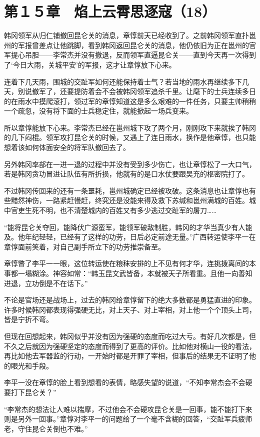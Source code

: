 \section{第１５章　焰上云霄思逐寇（18）}

韩冈领军从归仁铺撤回昆仑关的消息，章惇前天已经收到了。之前韩冈领军直扑邕州的军报曾差点让他跳脚，看到韩冈返回昆仑关的消息，他仍依旧为正在邕州的官军提心吊胆——李常杰并没有撤退，反而领军直逼昆仑关——直到今天再一次得到了‘今日大雨，关城平安’的军报，这才让章惇放下心来。

连着下几天雨，围城的交趾军如何还能保持着士气？若当地的雨水再继续多下几天，别说撤军了，还要提防着会不会被韩冈领军追杀千里。让麾下的士兵连续多日的在雨水中摸爬滚打，领过军的章惇知道这是多么艰难的一件任务，只要主帅稍稍一个疏忽，没有将下面的士兵稳定住，就能掀起一场兵变来。

所以章惇能放下心来。李常杰已经在邕州城下攻了两个月，刚刚攻下来就挨了韩冈的几下闷棍。领军攻打昆仑关的时候，又遇上了连日雨水，换作是他章惇，也只能想着该如何体面安全的将军队撤回去了。

另外韩冈率部在一进一退的过程中并没有受到多少伤亡，也让章惇松了一大口气，若是韩冈贪功冒进让队伍有所折损，他就有的是口水仗要跟吴充的枢密院打了。

不过韩冈传回来的还有一条噩耗，邕州城确定已经被攻破。这条消息也让章惇也有些黯然神伤，一路紧赶慢赶，终究还是没能来得及救下苏缄和邕州满城的百姓。城中官吏生死不明，也不清楚城内的百姓又有多少逃过交趾军的屠刀……

“能将昆仑关夺回，能降伏广源蛮军，能领军破敌制胜，韩冈的才华当真少有人能及。他年纪轻轻，已经有了这样的功劳，日后必定前途无量。”广西转运使李平一在章惇面前笑着，对自己副手所立下的功劳推崇备至。

章惇瞥了李平一一眼，这位转运使在粮秣安排的上不见有何才华，连挑拨离间的本事都一塌糊涂。神容如常：“韩玉昆文武皆备，本就被天子所看重。且他一向善知进退，立功倒是不在话下。”

不论是官场还是战场上，过去的韩冈给章惇留下的绝大多数都是勇猛直进的印象。许多时候韩冈都表现得强硬无比，对上天子、对上宰相，对上他一个个顶头上司，皆是宁折不弯。

但现在回想起来，韩冈似乎并没有因为强硬的态度而吃过大亏。有好几次都是，但不久之后就因为强硬坚定的态度而得到了更高的评价。比如他对横山一役的看法，再比如他去军器监的行动，一开始时都是开罪了宰相，但事后的结果无不证明了他的眼光和手段。

李平一没在章惇的脸上看到想看的表情，略感失望的说道，“不知李常杰会不会硬要打下昆仑关？”

“李常杰的想法让人难以揣摩，不过他会不会硬攻昆仑关是一回事，能不能打下来则是另外一回事。”章惇对李平一的问题给了一个毫不含糊的回答，“交趾军兵疲师老，守住昆仑关倒也不难。”

